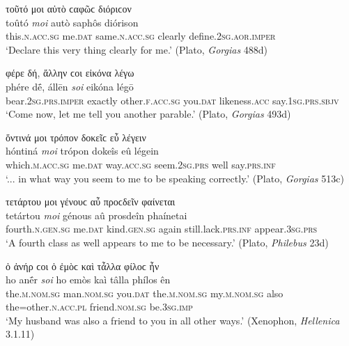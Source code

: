 \begin{exe}
\ex τοῦτό μοι αὐτὸ ϲαφῶϲ διόριϲον\\
\gll toûtó \emph{moi} autò saphôs diórison\\
this.\textsc{n.acc.sg} me.\textsc{dat} same.\textsc{n.acc.sg} clearly define.\textsc{2sg.aor.imper}\\
\trans `Declare this very thing clearly for me.' (Plato, \textit{Gorgias} 488d)
\label{attsep23}
\end{exe}

\begin{exe}
\ex φέρε δή, ἄλλην ϲοι εἰκόνα λέγω\\
\gll phére dḗ, állēn \emph{soi} eikóna légō\\
bear.\textsc{2sg.prs.imper} exactly other.\textsc{f.acc.sg} you.\textsc{dat} likeness.\textsc{acc} say.\textsc{1sg.prs.sbjv}\\
\trans `Come now, let me tell you another parable.' (Plato, \textit{Gorgias} 493d)
\label{attsep24}
\end{exe}

\begin{exe}
\ex ὅντινά μοι τρόπον δοκεῖϲ εὖ λέγειν\\
\gll hóntiná \emph{moi} trópon dokeîs eû légein\\
which.\textsc{m.acc.sg} me.\textsc{dat} way.\textsc{acc.sg} seem.\textsc{2sg.prs} well say.\textsc{prs.inf}\\
\trans `... in what way you seem to me to be speaking correctly.' (Plato, \textit{Gorgias} 513c)
\label{attsep25}
\end{exe}

\begin{exe}
\ex τετάρτου μοι γένουϲ αὖ προϲδεῖν φαίνεται\\
\gll tetártou \emph{moi} génous aû prosdeîn phaínetai\\
fourth.\textsc{n.gen.sg} me.\textsc{dat} kind.\textsc{gen.sg} again still.lack.\textsc{prs.inf} appear.\textsc{3sg.prs}\\
\trans `A fourth class as well appears to me to be necessary.' (Plato, \textit{Philebus} 23d)
\label{attsep26}
\end{exe}

\begin{exe}
\ex ὁ ἀνήρ ϲοι ὁ ἐμὸϲ καὶ τἆλλα φίλοϲ ἦν\\
\gll ho anḗr \emph{soi} ho emòs kaì tâlla phílos ên\\
the.\textsc{m.nom.sg} man.\textsc{nom.sg} you.\textsc{dat} the.\textsc{m.nom.sg} my.\textsc{m.nom.sg} also the=other.\textsc{n.acc.pl} friend.\textsc{nom.sg}
be.\textsc{3sg.imp}\\
\trans `My husband was also a friend to you in all other ways.' (Xenophon, \textit{Hellenica} 3.1.11)
\label{attsep27}
\end{exe}

